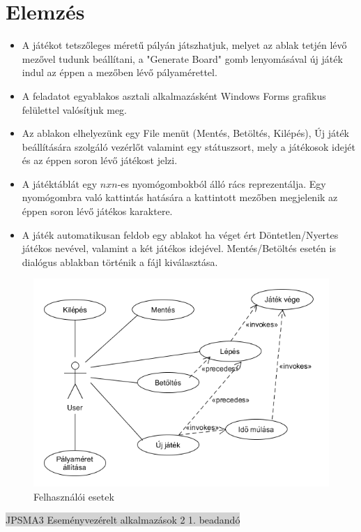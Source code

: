 \documentclass[11pt,a4paper]{article}
\begin{document}
\section{Elemzés}
\begin{itemize}
	\item A játékot tetszőleges méretű pályán játszhatjuk, melyet az ablak tetjén lévő
	mezővel tudunk beállítani, a "Generate Board" gomb lenyomásával új játék indul az
	éppen a mezőben lévő pályamérettel.
	\item A feladatot egyablakos asztali alkalmazásként Windows Forms grafikus felülettel
	valósítjuk meg.
	\item Az ablakon elhelyezünk egy File menüt (Mentés, Betöltés, Kilépés), Új játék
	beállítására szolgáló vezérlőt valamint egy státuszsort, mely a játékosok idejét és
	az éppen soron lévő játékost jelzi.
	\item A játéktáblát egy $nxn$-es nyomógombokból álló rács reprezentálja. Egy
	nyomógombra való kattintás hatására a kattintott mezőben megjelenik az éppen soron lévő játékos karaktere.
	\item A játék automatikusan feldob egy ablakot ha véget ért Döntetlen/Nyertes játékos
	nevével, valamint a két játékos idejével. Mentés/Betöltés esetén is dialógus ablakban
	történik a fájl kiválasztása.
\end{itemize}
\begin{figure}[h]
	\centering
	  \includegraphics[width=12cm]{UMLs/UseCase.png}
	\caption{Felhasználói esetek}
\end{figure}
\newpage
\thispagestyle{empty}
\begin{center}
	\colorbox{lightgray}{{\large JPSMA3} \hspace{3cm} {\large Eseményvezérelt alkalmazások 2 1. beadandó} \hspace{5cm} \thepage}
\end{center}
\end{document}

